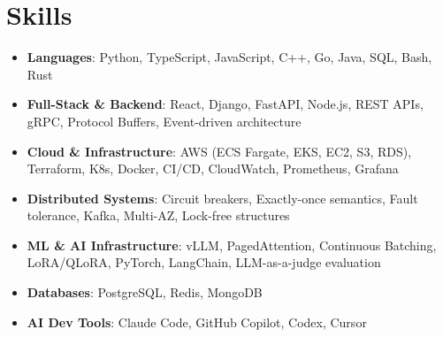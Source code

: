 \documentclass[letterpaper,11pt]{article}
\newcommand{\resumeSubHeadingListStart}{\begin{itemize}[leftmargin=0.15in, label={}]}
\newcommand{\resumeSubHeadingListEnd}{\end{itemize}}
\newcommand{\resumeSkillHeading}[2]{%
  \item\small{\textbf{#1}: #2 \vspace{-9pt}}%
}
\begin{document}
\section{Skills}
  \resumeSubHeadingListStart
    \resumeSkillHeading{Languages}{Python, TypeScript, JavaScript, C++, Go, Java, SQL, Bash, Rust}
    \resumeSkillHeading{Full-Stack \& Backend}{React, Django, FastAPI, Node.js, REST APIs, gRPC, Protocol Buffers, Event-driven architecture}
    \resumeSkillHeading{Cloud \& Infrastructure}{AWS (ECS Fargate, EKS, EC2, S3, RDS), Terraform, K8s, Docker, CI/CD, CloudWatch, Prometheus, Grafana}
    \resumeSkillHeading{Distributed Systems}{Circuit breakers, Exactly-once semantics, Fault tolerance, Kafka, Multi-AZ, Lock-free structures}
    \resumeSkillHeading{ML \& AI Infrastructure}{vLLM, PagedAttention, Continuous Batching, LoRA/QLoRA, PyTorch, LangChain, LLM-as-a-judge evaluation}
    \resumeSkillHeading{Databases}{PostgreSQL, Redis, MongoDB}
    \resumeSkillHeading{AI Dev Tools}{Claude Code, GitHub Copilot, Codex, Cursor}
  \resumeSubHeadingListEnd
\end{document}
